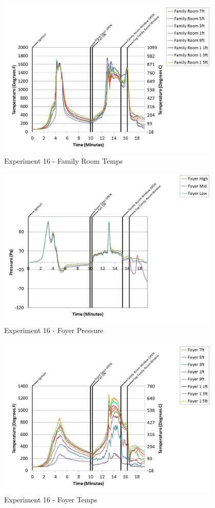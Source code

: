 \documentclass{article}
\begin{document}
\begin{appendices}
	\clearpage

	\begin{figure}[h!]
		\centering
		\includegraphics[height=3.05in]{0_Images/Results_Charts/Exp_16_Charts/FamilyRoomTemps.pdf}
		\caption{Experiment 16 - Family Room Temps}
	\end{figure}
 

	\begin{figure}[h!]
		\centering
		\includegraphics[height=3.05in]{0_Images/Results_Charts/Exp_16_Charts/FoyerPressure.pdf}
		\caption{Experiment 16 - Foyer Pressure}
	\end{figure}
 
	\clearpage

	\begin{figure}[h!]
		\centering
		\includegraphics[height=3.05in]{0_Images/Results_Charts/Exp_16_Charts/FoyerTemps.pdf}
		\caption{Experiment 16 - Foyer Temps}
	\end{figure}
 


\end{appendices}
\end{document}

